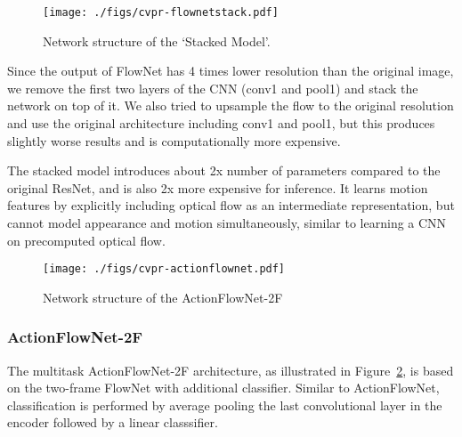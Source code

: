 \documentclass[10pt,twocolumn,letterpaper]{article}
\begin{document}
\begin{figure}[h!]
\centering
	\texttt{[image: ./figs/cvpr-flownetstack.pdf]}	
  \caption{Network structure of the `Stacked Model'.}
	\label{fig:stacked_archi}
  \vspace{-.5em}
\end{figure}%

Since the output of FlowNet has 4 times lower resolution than the original image, we remove the first two layers of the CNN (conv1 and pool1) and stack the network on top of it.
We also tried to upsample the flow to the original resolution and use the original architecture including conv1 and pool1, but this produces slightly worse results and is computationally more expensive.

The stacked model introduces about 2x number of parameters compared to the original ResNet, and is also 2x more expensive for inference.
It learns motion features by explicitly including optical flow as an intermediate representation, but cannot model appearance and motion simultaneously, similar to learning a CNN on precomputed optical flow.

\begin{figure}[th!]
\centering
	\texttt{[image: ./figs/cvpr-actionflownet.pdf]}	
	\caption{Network structure of the ActionFlowNet-2F}
	\vspace{-2em}
	\label{fig:mt_archi}
\end{figure}\subsubsection{ActionFlowNet-2F}
The multitask ActionFlowNet-2F architecture, as illustrated in Figure~\ref{fig:mt_archi}, is based on the two-frame FlowNet with additional classifier. 
Similar to ActionFlowNet, classification is performed by average pooling the last convolutional layer in the encoder followed by a linear classsifier.
\end{document}
